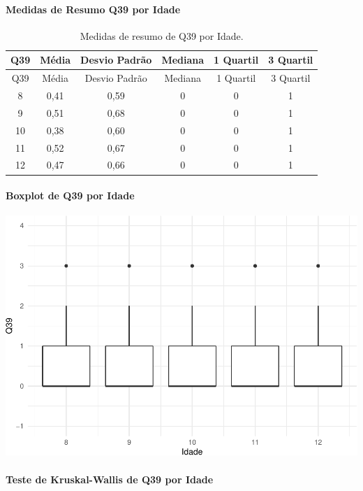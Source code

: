 \documentclass[]{article}
\let\oldparagraph\paragraph
\renewcommand{\paragraph}[1]{\oldparagraph{#1}\mbox{}}
\begin{document}
\cleardoublepage

\hypertarget{medidas-de-resumo-q39-por-idade}{%
\paragraph{Medidas de Resumo Q39 por Idade}\label{medidas-de-resumo-q39-por-idade}}

\begin{longtable}[]{@{}cccccc@{}}
\caption{\label{tab:unnamed-chunk-1511}Medidas de resumo de Q39 por Idade.}\tabularnewline
\toprule
Q39 & Média & Desvio Padrão & Mediana & 1 Quartil & 3 Quartil\tabularnewline
\midrule
\endfirsthead
\toprule
Q39 & Média & Desvio Padrão & Mediana & 1 Quartil & 3 Quartil\tabularnewline
\midrule
\endhead
8 & 0,41 & 0,59 & 0 & 0 & 1\tabularnewline
9 & 0,51 & 0,68 & 0 & 0 & 1\tabularnewline
10 & 0,38 & 0,60 & 0 & 0 & 1\tabularnewline
11 & 0,52 & 0,67 & 0 & 0 & 1\tabularnewline
12 & 0,47 & 0,66 & 0 & 0 & 1\tabularnewline
\bottomrule
\end{longtable}

\hypertarget{boxplot-de-q39-por-idade}{%
\paragraph{Boxplot de Q39 por Idade}\label{boxplot-de-q39-por-idade}}

\begin{center}\includegraphics[width=0.75\linewidth]{relatorio_covid19_files/figure-latex/unnamed-chunk-1512-1} \end{center}

\hypertarget{teste-de-kruskal-wallis-de-q39-por-idade}{%
\paragraph{Teste de Kruskal-Wallis de Q39 por Idade}\label{teste-de-kruskal-wallis-de-q39-por-idade}}
\end{document}
